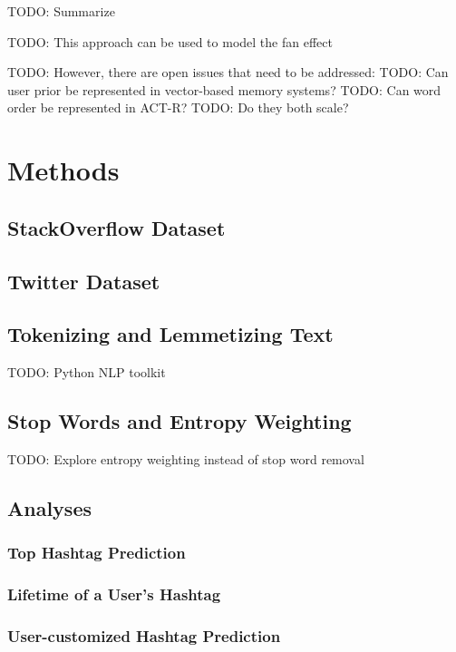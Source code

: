 \documentclass[man]{apa6}
\begin{document}
TODO: Summarize \cite{Rutledge2007}

TODO: This approach can be used to model the fan effect \cite{Rutledge2008} 

TODO: However, there are open issues that need to be addressed:
TODO: Can user prior be represented in vector-based memory systems?
TODO: Can word order be represented in ACT-R?
TODO: Do they both scale?

\section{Methods}

\subsection{StackOverflow Dataset}

\cite{DataDump2013}

\subsection{Twitter Dataset}

\subsection{Tokenizing and Lemmetizing Text}

TODO: Python NLP toolkit \cite{Bird2009}

\subsection{Stop Words and Entropy Weighting}

TODO: Explore entropy weighting instead of stop word removal \cite{Dumais1991}

\subsection{Analyses}

\subsubsection{Top Hashtag Prediction}

\subsubsection{Lifetime of a User's Hashtag}

\subsubsection{User-customized Hashtag Prediction}

\printbibliography
\end{document}
